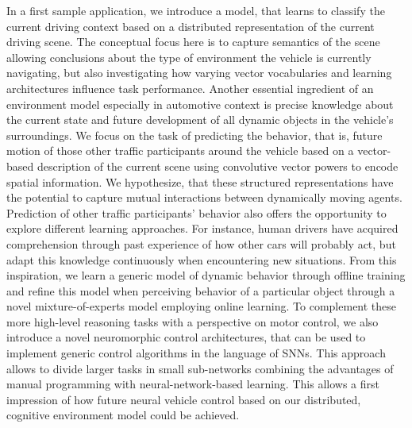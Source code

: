 In a first sample application, we introduce a model, that learns to classify the current driving context based on a distributed representation of the current driving scene. 
The conceptual focus here is to capture semantics of the scene allowing conclusions about the type of environment the vehicle is currently navigating, but also investigating how varying vector vocabularies and learning architectures influence task performance.
Another essential ingredient of an environment model especially in automotive context is precise knowledge about the current state and future development of all dynamic objects in the vehicle's surroundings.
We focus on the task of predicting the behavior, that is, future motion of those other traffic participants around the vehicle based on a vector-based description of the current scene using convolutive vector powers to encode spatial information.
We hypothesize, that these structured representations have the potential to capture mutual interactions between dynamically moving agents.
Prediction of other traffic participants' behavior also offers the opportunity to explore different learning approaches.
For instance, human drivers have acquired comprehension through past experience of how other cars will probably act, but adapt this knowledge continuously when encountering new situations.
From this inspiration, we learn a generic model of dynamic behavior through offline training and refine this model when perceiving behavior of a particular object through a novel mixture-of-experts model employing online learning.
To complement these more high-level reasoning tasks with a perspective on motor control, we also introduce a novel neuromorphic control architectures, that can be used to implement generic control algorithms in the language of \acp{SNN}.
This approach allows to divide larger tasks in small sub-networks combining the advantages of manual programming with neural-network-based learning.
This allows a first impression of how future neural vehicle control based on our distributed, cognitive environment model could be achieved.
